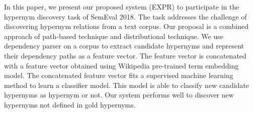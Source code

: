 In this paper, we present our proposed system (EXPR) to participate in the hypernym discovery task of SemEval 2018. The task addresses the challenge of discovering hypernym relations from a text corpus. Our proposal is a combined approach of path-based technique and distributional technique. We use dependency parser on a corpus to extract candidate hypernyms and represent their dependency paths as a feature vector. The feature vector is concatenated with a feature vector obtained using Wikipedia pre-trained term embedding model. The concatenated feature vector fits a supervised machine learning method to learn a classifier model. This model is able to classify new candidate hypernyms as hypernym or not. Our system performs well to discover new hypernyms not defined in gold hypernyms.
